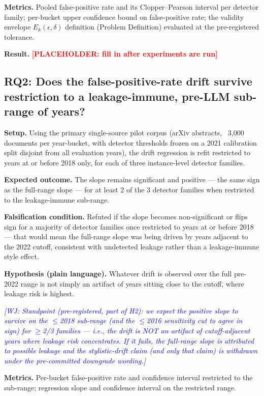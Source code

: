 \documentclass[conference]{IEEEtran}
\newcommand{\placeholder}[1]{\textcolor{red}{\textbf{[PLACEHOLDER: #1]}}}
\newcommand{\wj}[1]{\textcolor{blue}{\emph{[WJ: #1]}}}
\begin{document}
\textbf{Metrics.} Pooled false-positive rate and its Clopper--Pearson interval per detector family; per-bucket upper confidence bound on false-positive rate; the validity envelope $E_k(\epsilon,\delta)$ definition (Problem Definition) evaluated at the pre-registered tolerance.

\textbf{Result.} \placeholder{fill in after experiments are run}

\subsection{RQ2: Does the false-positive-rate drift survive restriction to a leakage-immune, pre-LLM sub-range of years?}

 \textbf{Setup.} Using the primary single-source pilot corpus (arXiv abstracts, ~3,000 documents per year-bucket, with detector thresholds frozen on a 2021 calibration split disjoint from all evaluation years), the drift regression is refit restricted to years at or before 2018 only, for each of three instance-level detector families.

\textbf{Expected outcome.} The slope remains significant and positive --- the same sign as the full-range slope --- for at least 2 of the 3 detector families when restricted to the leakage-immune sub-range.

\textbf{Falsification condition.} Refuted if the slope becomes non-significant or flips sign for a majority of detector families once restricted to years at or before 2018 --- that would mean the full-range slope was being driven by years adjacent to the 2022 cutoff, consistent with undetected leakage rather than a leakage-immune style effect.

\textbf{Hypothesis (plain language).} Whatever drift is observed over the full pre-2022 range is not simply an artifact of years sitting close to the cutoff, where leakage risk is highest.

\wj{Standpoint (pre-registered, part of H2): we expect the positive slope to survive on the $\leq$2018 sub-range (and the $\leq$2016 sensitivity cut to agree in sign) for $\geq$2/3 families --- i.e., the drift is NOT an artifact of cutoff-adjacent years where leakage risk concentrates. If it fails, the full-range slope is attributed to possible leakage and the stylistic-drift claim (and only that claim) is withdrawn under the pre-committed downgrade wording.}

\textbf{Metrics.} Per-bucket false-positive rate and confidence interval restricted to the sub-range; regression slope and confidence interval on the restricted range.
\end{document}
